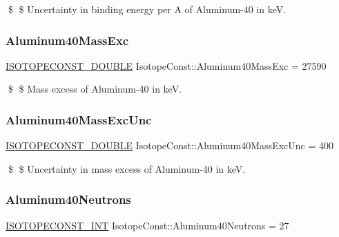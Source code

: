 \$ \$ Uncertainty in binding energy per A of Aluminum-\/40 in keV. \mbox{\label{group___isotope_const-_aluminum-_al40_ga5e9dc6bbfe517bdc72574f8a73faa318}} 
\subsubsection{\texorpdfstring{Aluminum40\+Mass\+Exc}{Aluminum40MassExc}}
{\footnotesize\ttfamily \mbox{\hyperlink{group___isotope_const-_macros_ga8f45a7272ce02c0b4c65c44636ed719a}{I\+S\+O\+T\+O\+P\+E\+C\+O\+N\+S\+T\+\_\+\+D\+O\+U\+B\+LE}} Isotope\+Const\+::\+Aluminum40\+Mass\+Exc = 27590}

\$ \$ Mass excess of Aluminum-\/40 in keV. \mbox{\label{group___isotope_const-_aluminum-_al40_ga01f471cac9f23213866c62f4be4379c2}} 
\subsubsection{\texorpdfstring{Aluminum40\+Mass\+Exc\+Unc}{Aluminum40MassExcUnc}}
{\footnotesize\ttfamily \mbox{\hyperlink{group___isotope_const-_macros_ga8f45a7272ce02c0b4c65c44636ed719a}{I\+S\+O\+T\+O\+P\+E\+C\+O\+N\+S\+T\+\_\+\+D\+O\+U\+B\+LE}} Isotope\+Const\+::\+Aluminum40\+Mass\+Exc\+Unc = 400}

\$ \$ Uncertainty in mass excess of Aluminum-\/40 in keV. \mbox{\label{group___isotope_const-_aluminum-_al40_gacdd8a59daeee21fd1b7fb4277af0d089}} 
\subsubsection{\texorpdfstring{Aluminum40\+Neutrons}{Aluminum40Neutrons}}
{\footnotesize\ttfamily \mbox{\hyperlink{group___isotope_const-_macros_ga5f18360b3e99483a35c32d789e62621c}{I\+S\+O\+T\+O\+P\+E\+C\+O\+N\+S\+T\+\_\+\+I\+NT}} Isotope\+Const\+::\+Aluminum40\+Neutrons = 27}

